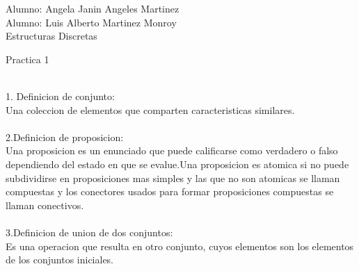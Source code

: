 \documentclass{book}
\begin{document}
Alumno: Angela Janin Angeles Martinez\\
Alumno: Luis Alberto Martinez Monroy\\
Estructuras Discretas\\
\begin{center}
  Practica 1\\ \\
  
\end{center}
1. Definicion de conjunto:\\
Una coleccion de elementos que comparten caracteristicas similares.\\ \\

2.Definicion de proposicion:\\
Una proposicion es un enunciado que puede calificarse como verdadero o falso dependiendo del estado en que se evalue.Una proposicion es atomica si no puede subdividirse en proposiciones mas simples y las que no son atomicas se llaman compuestas y los conectores usados para formar proposiciones compuestas se llaman conectivos.\\ \\

3.Definicion de union de dos conjuntos:\\
Es una operacion que resulta en otro conjunto, cuyos elementos son los elementos de los conjuntos iniciales.\\
\end{document}
